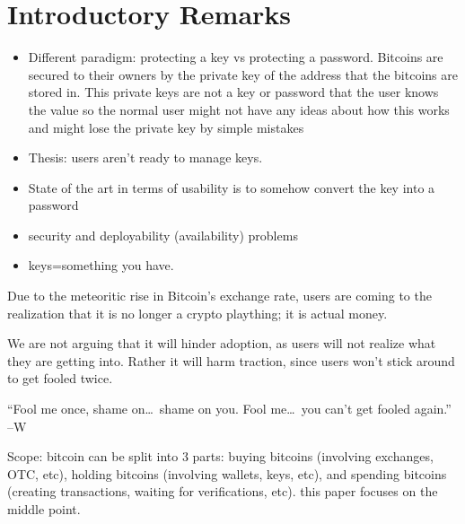
\section{Introductory Remarks}



\begin{itemize}
\item Different paradigm: protecting a key vs protecting a password. 
Bitcoins are secured to their owners by the private key of the address that the bitcoins are stored in. This private keys are not a key or password that the user knows the value so the normal user might not have any ideas about how this works and might lose the private key by simple mistakes

\item Thesis: users aren't ready to manage keys. 
\item State of the art in terms of usability is to somehow convert the key into a password
\item security and deployability (availability) problems
\item keys=something you have. 
\end{itemize}





Due to the meteoritic rise in Bitcoin's exchange rate, users are coming to the realization that it is no longer a crypto plaything; it is actual money. 


We are not arguing that it will hinder adoption, as users will not realize what they are getting into. Rather it will harm traction, since users won't stick around to get fooled twice. 

``Fool me once, shame on\ldots~shame on you. Fool me\ldots~you can't get fooled again.'' --W

Scope: bitcoin can be split into 3 parts: buying bitcoins (involving exchanges, OTC, etc), holding bitcoins (involving wallets, keys, etc), and spending bitcoins (creating transactions, waiting for verifications, etc). this paper focuses on the middle point. 
